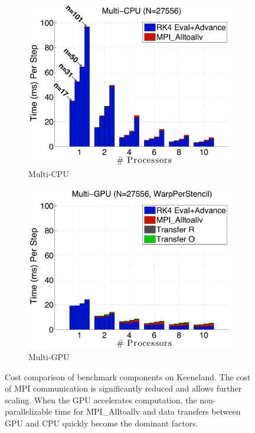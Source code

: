 \begin{figure}
\centering
\begin{subfigure}[t]{0.425\textwidth}
\centering
\includegraphics[width=1.0\textwidth]{../figures/keeneland_results/alltoallv_cosine/multiCPU_costs.pdf}
\caption{Multi-CPU}
\label{fig:alltoall_multicpu_costs}
\end{subfigure} 
\begin{subfigure}[t]{0.425\textwidth}
\centering
\includegraphics[width=1.0\textwidth]{../figures/keeneland_results/alltoallv_cosine/multiGPU_warp_costs.pdf}
\caption{Multi-GPU}
\label{fig:alltoall_multigpu_costs}
\end{subfigure} 
\caption{Cost comparison of benchmark components on Keeneland. The cost of MPI communication is significantly reduced and allows further scaling. When the GPU accelerates computation, the non-parallelizable time for MPI\_Alltoallv and data transfers between GPU and CPU quickly become the dominant factors.}
\end{figure} 

